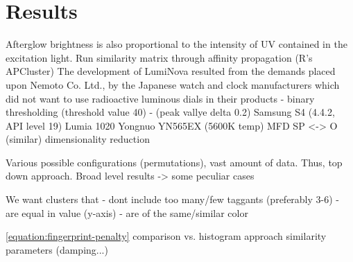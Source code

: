 \documentclass[thesis.tex]{subfiles}
\begin{document}
\chapter{Results}
\label{chapter:results}
Afterglow brightness is also proportional to the intensity of UV contained in the excitation light.
Run similarity matrix through affinity propagation (R's APCluster)
The development of LumiNova resulted from the demands placed upon Nemoto  Co. Ltd.,  by the Japanese watch and clock manufacturers which did not want to use radioactive luminous dials in their products
- binary thresholding (threshold value 40)
- (peak vallye delta 0.2)
Samsung S4 (4.4.2, API level 19)
Lumia 1020
Yongnuo YN565EX (5600K temp)
MFD
SP <-> O (similar)
dimensionality reduction

Various possible configurations (permutations), vast amount of data. Thus, top down approach. Broad level results -> some peculiar cases

We want clusters that
- dont include too many/few taggants (preferably 3-6)
- are equal in value (y-axis)
- are of the same/similar color

\ref{equation:fingerprint-penalty}
comparison vs. histogram approach
similarity parameters (damping...)
\end{document}
